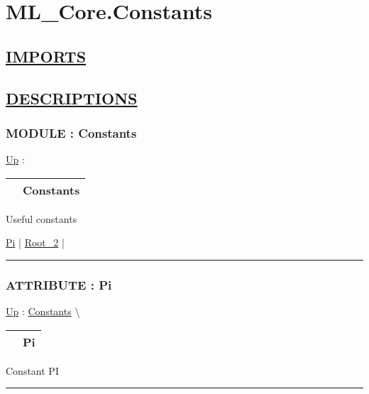 \chapter*{ML\_Core.Constants}
\hypertarget{ecldoc:toc:ML_Core.Constants}{}

\section*{\underline{IMPORTS}}

\section*{\underline{DESCRIPTIONS}}
\subsection*{MODULE : Constants}
\hypertarget{ecldoc:ML_Core.Constants}{}
\hyperlink{ecldoc:toc:ML_Core}{Up} :

{\renewcommand{\arraystretch}{1.5}
\begin{tabularx}{\textwidth}{|>{\raggedright\arraybackslash}l|X|}
\hline
\hspace{0pt} & Constants \\
\hline
\end{tabularx}
}

\par
Useful constants


\hyperlink{ecldoc:ml_core.constants.pi}{Pi}  |
\hyperlink{ecldoc:ml_core.constants.root_2}{Root\_2}  |

\rule{\linewidth}{0.5pt}

\subsection*{ATTRIBUTE : Pi}
\hypertarget{ecldoc:ml_core.constants.pi}{}
\hyperlink{ecldoc:ML_Core.Constants}{Up} :
\hspace{0pt} \hyperlink{ecldoc:ML_Core.Constants}{Constants} \textbackslash 

{\renewcommand{\arraystretch}{1.5}
\begin{tabularx}{\textwidth}{|>{\raggedright\arraybackslash}l|X|}
\hline
\hspace{0pt} & Pi \\
\hline
\end{tabularx}
}

\par
Constant PI


\rule{\linewidth}{0.5pt}

